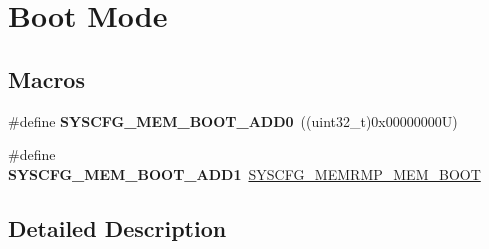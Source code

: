 \hypertarget{group___s_y_s_c_f_g___boot_mode}{}\section{Boot Mode}
\label{group___s_y_s_c_f_g___boot_mode}
\subsection*{Macros}
\begin{DoxyCompactItemize}
\item 
\mbox{\label{group___s_y_s_c_f_g___boot_mode_ga0201d0bbb235dec012edcd4bad92222b}} 
\#define {\bfseries S\+Y\+S\+C\+F\+G\+\_\+\+M\+E\+M\+\_\+\+B\+O\+O\+T\+\_\+\+A\+D\+D0}~((uint32\+\_\+t)0x00000000\+U)
\item 
\mbox{\label{group___s_y_s_c_f_g___boot_mode_ga71ed21f88bd74634a995cc1ae06169c2}} 
\#define {\bfseries S\+Y\+S\+C\+F\+G\+\_\+\+M\+E\+M\+\_\+\+B\+O\+O\+T\+\_\+\+A\+D\+D1}~\mbox{\hyperlink{group___peripheral___registers___bits___definition_ga2efc5ebe6f79c27456ab4c7f5d0c8066}{S\+Y\+S\+C\+F\+G\+\_\+\+M\+E\+M\+R\+M\+P\+\_\+\+M\+E\+M\+\_\+\+B\+O\+OT}}
\end{DoxyCompactItemize}


\subsection{Detailed Description}
